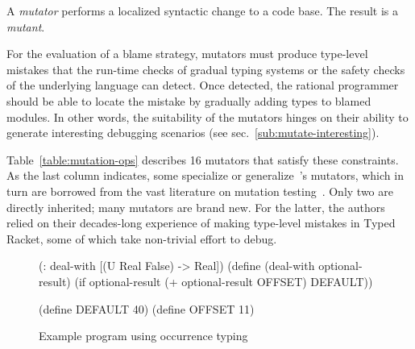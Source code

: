 
A {\it mutator\/} performs a localized syntactic change to a code base. The
result is a {\em mutant\/}.

For the evaluation of a blame strategy, mutators must produce type-level
mistakes that the run-time checks of gradual typing systems or the safety
checks of the underlying language can detect. Once detected, the rational
programmer should be able to locate the mistake by gradually adding types
to blamed modules. In other words, the suitability of the mutators hinges
on their ability to generate interesting debugging scenarios (see
sec.~\ref{sub:mutate-interesting}).


Table~\ref{table:mutation-ops} describes 16 mutators that satisfy these
constraints. As the last column indicates, some specialize or
generalize~\citet{lksfd-popl-2020}'s mutators, which in turn are borrowed from
the vast literature on mutation testing~\citep{jia2011analysis}.  Only two are
directly inherited; many mutators are brand new. For the latter, the authors
relied on their decades-long experience of making type-level mistakes in Typed
Racket, some of which take non-trivial effort to debug.

\begin{wrapfigure}{r}{.5\textwidth} \footnotesize
\hspace{0.2cm}
\begin{module}{}\typecolor
(: deal-with [(U Real False) -> Real])
(define (deal-with optional-result)
  (if optional-result
      (+ optional-result OFFSET)
      DEFAULT))

(define DEFAULT 40)
(define OFFSET  11)
\end{module}
\caption{Example program using occurrence typing}
\label{fig:negate-cond-example}
\end{wrapfigure}

